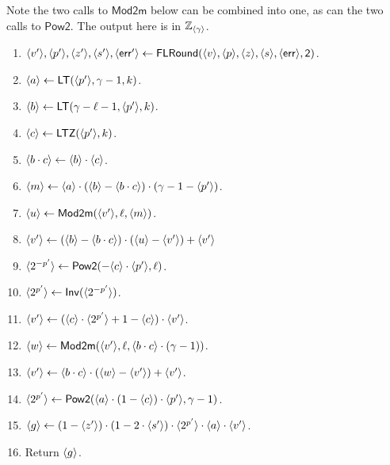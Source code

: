   \iffalse
      Note the two calls to $\mathsf{Mod2m}$ below can be combined into
      one, as can the two calls to $\mathsf{Pow2}$.
      The output here is in ${\mathbb{Z}}_{\langle \gamma \rangle}$.
    \begin{enumerate}
      \item $\langle v' \rangle,\langle p' \rangle,\langle z' \rangle,\langle s' \rangle,\langle \mathsf{err}' \rangle
              \leftarrow \mathsf{FLRound}(\langle v \rangle,\langle p \rangle,\langle z \rangle,\langle s \rangle,\langle \mathsf{err} \rangle,\mathsf{2})$.
      \item $\langle a \rangle \leftarrow \mathsf{LT}(\langle p' \rangle,\gamma-1,k)$.
      \item $\langle b \rangle \leftarrow \mathsf{LT}(\gamma-\ell-1,\langle p' \rangle,k)$.
      \item $\langle c \rangle \leftarrow \mathsf{LTZ}(\langle p' \rangle,k)$.
      \item $\langle b \cdot c \rangle \leftarrow \langle b \rangle \cdot \langle c \rangle$.
      \item $\langle m \rangle \leftarrow \langle a \rangle\cdot (\langle b \rangle -\langle b \cdot c \rangle)
              \cdot (\gamma-1-\langle p' \rangle)$.
      \item $\langle u \rangle \leftarrow \mathsf{Mod2m}(\langle v' \rangle,\ell,\langle m \rangle)$.
      \item $\langle v' \rangle \leftarrow (\langle b \rangle -\langle b \cdot c \rangle) \cdot ( \langle u \rangle-\langle v' \rangle) +\langle v' \rangle$
      \item $\langle 2^{-p'} \rangle \leftarrow \mathsf{Pow2}(-\langle c \rangle \cdot \langle p' \rangle,\ell)$.
      \item $\langle 2^{p'} \rangle \leftarrow \mathsf{Inv}(\langle 2^{-p'} \rangle)$.
      \item $\langle v' \rangle \leftarrow (\langle c \rangle \cdot \langle 2^{p'} \rangle+1-\langle c \rangle)
              \cdot \langle v' \rangle$.
      \item $\langle w \rangle \leftarrow \mathsf{Mod2m}(\langle v' \rangle,\ell,
              \langle b \cdot c \rangle\cdot(\gamma-1))$.
      \item $\langle v' \rangle \leftarrow \langle b \cdot c \rangle \cdot (\langle w \rangle-\langle v' \rangle) +\langle v' \rangle$.
      \item $\langle 2^{p'} \rangle \leftarrow \mathsf{Pow2}(\langle a \rangle \cdot (1-\langle c \rangle)
              \cdot \langle p' \rangle,\gamma-1)$.
      \item $\langle g \rangle \leftarrow (1-\langle z' \rangle) \cdot (1-2 \cdot \langle s' \rangle)
              \cdot \langle 2^{p'} \rangle \cdot \langle a \rangle
              \cdot \langle v' \rangle$.
      \item Return $\langle g \rangle$.
    \end{enumerate}

